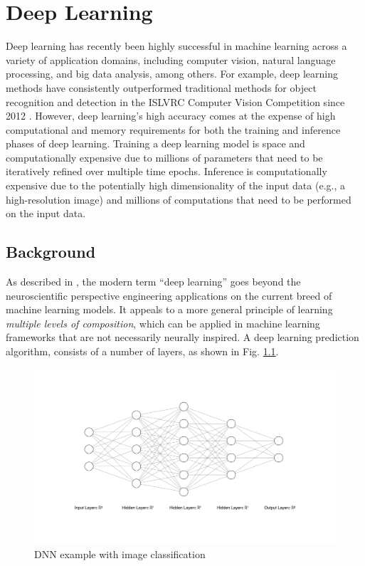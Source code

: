 \chapter{Deep Learning}
Deep learning has recently been highly successful in machine learning across a variety of application domains, including computer vision, natural language processing, and big data analysis, among others. For example, deep learning methods have consistently outperformed traditional methods for object recognition and detection in the ISLVRC Computer Vision Competition since 2012 \cite{ILSVRC15}. However, deep learning’s high accuracy comes at the expense of high computational and memory requirements for both the training and inference phases of deep learning. Training a deep learning model is space and computationally expensive due to millions of parameters that need to be iteratively refined over multiple time epochs. Inference is computationally expensive due to the potentially high dimensionality of the input data (e.g., a high-resolution image) and millions of computations that need to be performed on the input data.

\section{Background}
As described in \cite{Goodfellow-et-al-2016}, the modern term “deep learning” goes beyond the neuroscientific perspective engineering applications on the current breed of machine learning models. It appeals to a more general principle of learning \textit{multiple levels of composition}, which can be applied in machine learning frameworks that are not necessarily neurally inspired.
A deep learning prediction algorithm, consists of a number of layers, as shown in Fig. \ref{fig:dnn}.

\begin{figure}
	\includegraphics[width=\textwidth]{images/nn.png}
	\caption[DNN example]{DNN example with image classification}
	\label{fig:dnn}
\end{figure}

